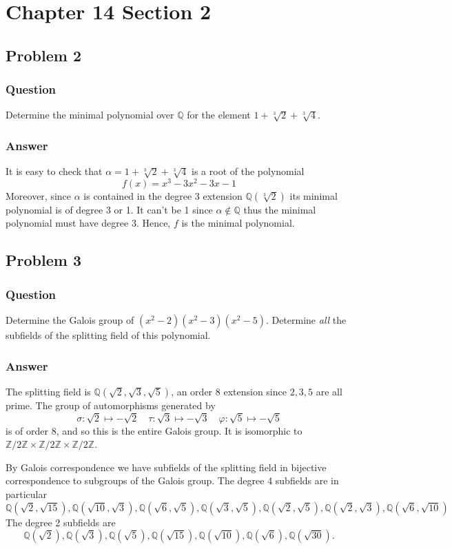 \documentclass[10pt]{article}
\begin{document}
\section{Chapter 14 Section 2}
\subsection{Problem 2}
\subsubsection{Question}
Determine the minimal polynomial over $\mathbb{Q}$ for the element $1+\sqrt[3]2+\sqrt[3]4$.
\subsubsection{Answer}
It is easy to check that $\alpha = 1+\sqrt[3]2+\sqrt[3]4$ is a root of the polynomial 
\[ f(x) = x^3 -3 x^2  -3 x - 1\]
Moreover, since $\alpha$ is contained in the degree 3 extension $\mathbb{Q}(\sqrt[3]2)$ its minimal polynomial is of degree 3 or 1. It can't be 1 since $\alpha \notin \mathbb{Q}$ thus the minimal polynomial must have degree 3. Hence, $f$ is the minimal polynomial.

\subsection{Problem 3}
\subsubsection{Question}
Determine the Galois group of $(x^2-2)(x^2-3)(x^2-5)$. Determine \emph{all} the subfields of the splitting field of this polynomial.
\subsubsection{Answer}
The splitting field is $\mathbb{Q}(\sqrt2, \sqrt 3, \sqrt 5)$, an order 8 extension since $2,3,5$ are all prime. The group of automorphisms generated by 
\[\sigma: \sqrt2 \mapsto -\sqrt2\quad \tau: \sqrt3\mapsto -\sqrt3 \quad \varphi:\sqrt5\mapsto -\sqrt5\]
is of order 8, and so this is the entire Galois group. It is isomorphic to $\mathbb{Z}/2\mathbb{Z} \times\mathbb{Z}/2\mathbb{Z} \times\mathbb{Z}/2\mathbb{Z}$.

By Galois correspondence we have subfields of the splitting field in bijective correspondence to subgroups of the Galois group. The degree 4 subfields are in particular
\[\mathbb{Q}(\sqrt2,\sqrt{15}), \mathbb{Q}(\sqrt{10},\sqrt3), \mathbb{Q}(\sqrt6,\sqrt5), \mathbb{Q}(\sqrt3,\sqrt5), \mathbb{Q}(\sqrt2,\sqrt5), \mathbb{Q}(\sqrt2,\sqrt3),\mathbb{Q}(\sqrt{6},\sqrt{10})  \]
The degree 2 subfields are 
\[\mathbb{Q}(\sqrt2), \mathbb{Q}(\sqrt3), \mathbb{Q}(\sqrt5), \mathbb{Q}(\sqrt{15}), \mathbb{Q}(\sqrt{10}), \mathbb{Q}(\sqrt6), \mathbb{Q}(\sqrt{30}).\]
\end{document}
